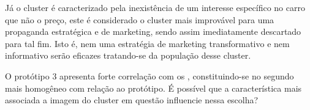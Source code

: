 Já o cluster \emph{\nomeCc{}} é caracterizado pela inexistência de
um interesse específico no carro que não o preço, este é considerado
o cluster mais improvável para uma propaganda estratégica e de marketing,
sendo assim imediatamente descartado para tal fim. Isto é, nem uma
estratégia de marketing transformativo e nem informativo serão eficazes
tratando-se da população desse cluster.

O protótipo 3 apresenta forte correlação com os \emph{\nomeCb{}},
constituindo-se no segundo mais homogêneo com relação ao protótipo.
É possível que a característica mais associada a imagem do cluster
em questão influencie nessa escolha? 
\begin{figure}[h]
\begin{centering}
\par\end{centering}


\end{figure}
